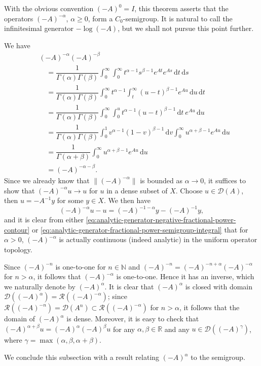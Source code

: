 With the obvious convention $(-A)^0=I$, this theorem asserts that the operators $(-A)^{-\alpha}$, $\alpha\geq0$, form a $C_0$-semigroup. It is natural to call the infinitesimal generator $-\log(-A)$, but we shall not pursue this point further.

\begin{Proof}
We have\[\begin{aligned}
&(-A)^{-\alpha}(-A)^{-\beta}\\
&\quad=\dfrac{1}{\Gamma(\alpha)\Gamma(\beta)}\int_0^\infty\int_0^\infty t^{\alpha-1}s^{\beta-1}e^{At}e^{As}\,\mathrm{d}t\,\mathrm{d}s\\
&\quad=\dfrac{1}{\Gamma(\alpha)\Gamma(\beta)}\int_0^\infty t^{\alpha-1}\int_t^\infty(u-t)^{\beta-1}e^{Au}\,\mathrm{d}u\,\mathrm{d}t\\
&\quad=\dfrac{1}{\Gamma(\alpha)\Gamma(\beta)}\int_0^\infty\int_0^u t^{\alpha-1}(u-t)^{\beta-1}\,\mathrm{d}t\ e^{Au}\,\mathrm{d}u\\
&\quad=\dfrac{1}{\Gamma(\alpha)\Gamma(\beta)}\int_0^1 v^{\alpha-1}(1-v)^{\beta-1}\,\mathrm{d}v\int_0^\infty u^{\alpha+\beta-1}e^{Au}\,\mathrm{d}u\\
&\quad=\dfrac{1}{\Gamma(\alpha+\beta)}\int_0^\infty u^{\alpha+\beta-1}e^{Au}\,\mathrm{d}u\\
&\quad=(-A)^{-\alpha-\beta}.
\end{aligned}\]Since we already know that $\|(-A)^{-\alpha}\|$ is bounded as $\alpha\to0$, it suffices to show that $(-A)^{-\alpha}u\to u$ for $u$ in a dense subset of $X$. Choose $u\in\mathcal{D}(A)$, then $u=-A^{-1}y$ for some $y\in X$. We then have
\begin{equation}\label{eq:fractional-power-semigroup-strong-continuity-reduction}
(-A)^{-\alpha}u-u=(-A)^{-1-\alpha}y-(-A)^{-1}y,
\end{equation}
and it is clear from either \eqref{eq:analytic-generator-negative-fractional-power-contour} or \eqref{eq:analytic-generator-fractional-power-semigroup-integral} that for $\alpha>0$, $(-A)^{-\alpha}$ is actually continuous (indeed analytic) in the uniform operator topology.
\end{Proof}

Since $(-A)^{-n}$ is one-to-one for $n\in\mathbb{N}$ and $(-A)^{-n}=(-A)^{-n+\alpha}(-A)^{-\alpha}$ for $n>\alpha$, it follows that $(-A)^{-\alpha}$ is one-to-one. Hence it has an inverse, which we naturally denote by $(-A)^\alpha$. It is clear that $(-A)^\alpha$ is closed with domain $\mathcal{D}((-A)^\alpha)=\mathcal{R}((-A)^{-\alpha})$; since $\mathcal{R}((-A)^{-n})=\mathcal{D}(A^n)\subset\mathcal{R}((-A)^{-\alpha})$ for $n>\alpha$, it follows that the domain of $(-A)^\alpha$ is dense. Moreover, it is easy to check that $(-A)^{\alpha+\beta}u=(-A)^\alpha(-A)^\beta u$ for any $\alpha,\beta\in\mathbb{R}$ and any $u\in\mathcal{D}((-A)^\gamma)$, where $\gamma=\max(\alpha,\beta,\alpha+\beta)$.\par We conclude this subsection with a result relating $(-A)^\alpha$ to the semigroup.

